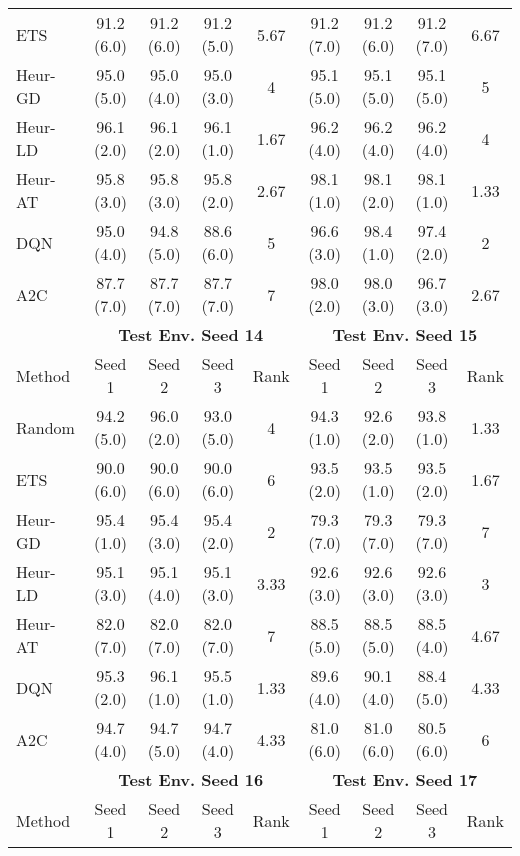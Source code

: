 \begin{table}[t]
{\begin{tabular}{lcccccccc}
ETS        & 91.2 (6.0) & 91.2 (6.0) & 91.2 (5.0) & 5.67 & 91.2 (7.0) & 91.2 (6.0) & 91.2 (7.0) & 6.67 \\
Heur-GD & 95.0 (5.0) & 95.0 (4.0) & 95.0 (3.0) & 4    & 95.1 (5.0) & 95.1 (5.0) & 95.1 (5.0) & 5    \\
Heur-LD & 96.1 (2.0) & 96.1 (2.0) & 96.1 (1.0) & 1.67 & 96.2 (4.0) & 96.2 (4.0) & 96.2 (4.0) & 4    \\
Heur-AT & 95.8 (3.0) & 95.8 (3.0) & 95.8 (2.0) & 2.67 & 98.1 (1.0) & 98.1 (2.0) & 98.1 (1.0) & 1.33 \\
DQN        & 95.0 (4.0) & 94.8 (5.0) & 88.6 (6.0) & 5    & 96.6 (3.0) & 98.4 (1.0) & 97.4 (2.0) & 2    \\
A2C        & 87.7 (7.0) & 87.7 (7.0) & 87.7 (7.0) & 7    & 98.0 (2.0) & 98.0 (3.0) & 96.7 (3.0) & 2.67 \\ \midrule
\textbf{}  & \multicolumn{4}{c}{\textbf{Test Env. Seed 14}}    & \multicolumn{4}{c}{\textbf{Test Env. Seed 15}}    \\
    \cmidrule(lr){2-5} \cmidrule(lr){6-9} 
Method     & Seed 1     & Seed 2     & Seed 3     & Rank & Seed 1     & Seed 2     & Seed 3     & Rank \\ \midrule
Random     & 94.2 (5.0) & 96.0 (2.0) & 93.0 (5.0) & 4    & 94.3 (1.0) & 92.6 (2.0) & 93.8 (1.0) & 1.33 \\
ETS        & 90.0 (6.0) & 90.0 (6.0) & 90.0 (6.0) & 6    & 93.5 (2.0) & 93.5 (1.0) & 93.5 (2.0) & 1.67 \\
Heur-GD & 95.4 (1.0) & 95.4 (3.0) & 95.4 (2.0) & 2    & 79.3 (7.0) & 79.3 (7.0) & 79.3 (7.0) & 7    \\
Heur-LD & 95.1 (3.0) & 95.1 (4.0) & 95.1 (3.0) & 3.33 & 92.6 (3.0) & 92.6 (3.0) & 92.6 (3.0) & 3    \\
Heur-AT & 82.0 (7.0) & 82.0 (7.0) & 82.0 (7.0) & 7    & 88.5 (5.0) & 88.5 (5.0) & 88.5 (4.0) & 4.67 \\
DQN        & 95.3 (2.0) & 96.1 (1.0) & 95.5 (1.0) & 1.33 & 89.6 (4.0) & 90.1 (4.0) & 88.4 (5.0) & 4.33 \\
A2C        & 94.7 (4.0) & 94.7 (5.0) & 94.7 (4.0) & 4.33 & 81.0 (6.0) & 81.0 (6.0) & 80.5 (6.0) & 6    \\ \midrule
\textbf{}  & \multicolumn{4}{c}{\textbf{Test Env. Seed 16}}    & \multicolumn{4}{c}{\textbf{Test Env. Seed 17}}    \\
    \cmidrule(lr){2-5} \cmidrule(lr){6-9} 
Method     & Seed 1     & Seed 2     & Seed 3     & Rank & Seed 1     & Seed 2     & Seed 3     & Rank \\ \midrule

\end{tabular}}
\end{table}
